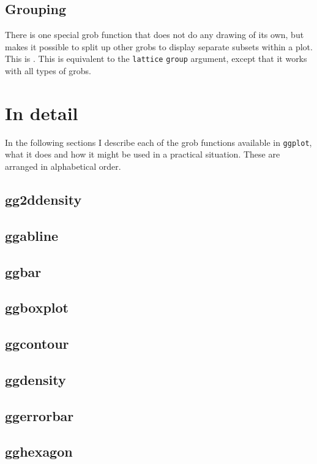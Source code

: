\subsection{Grouping}\label{sub:grouping}

There is one special grob function that does not do any drawing of its own, but makes it possible to split up other grobs to display separate subsets within a plot.  This is .  This is equivalent to the {\tt lattice} {\tt group} argument, except that it works with all types of grobs.  

\section{In detail}\label{sec:in_detail}

In the following sections I describe each of the grob functions available in {\tt ggplot}, what it does and how it might be used in a practical situation.  These are arranged in alphabetical order.

\subsection{gg2ddensity}\label{sub:gg2ddensity}
\subsection{ggabline}\label{sub:ggabline}
\subsection{ggbar}\label{sub:ggbar}
\subsection{ggboxplot}\label{sub:ggboxplot}
\subsection{ggcontour}\label{sub:ggcontour}
\subsection{ggdensity}\label{sub:ggdensity}
\subsection{ggerrorbar}\label{sub:ggerrorbar}
\subsection{gghexagon}\label{sub:gghexagon}
